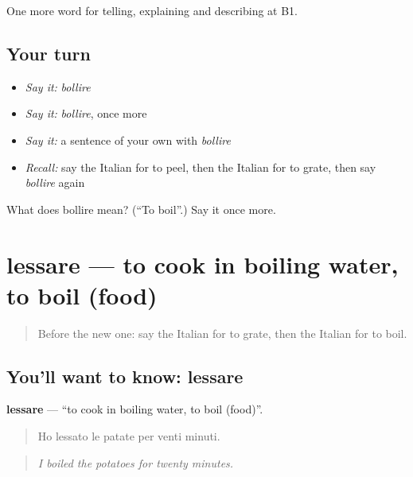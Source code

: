 \begin{grammarlens}[title={What you've built}]
One more word for telling, explaining and describing at B1.
\end{grammarlens}

\subsection*{Your turn}
\begin{itemize}
\raggedright
  \item \emph{Say it:} \emph{bollire}
  \item \emph{Say it:} \emph{bollire}, once more
  \item \emph{Say it:} a sentence of your own with \emph{bollire}
  \item \emph{Recall:} say the Italian for to peel, then the Italian for to grate, then say \emph{bollire} again
\end{itemize}

\begin{tcolorbox}[breakable,colback=teal!4,colframe=teal!35!black,title={Before you move on}]
What does bollire mean? (\textquotedblleft{}To boil\textquotedblright{}.) Say it once more.
\end{tcolorbox}
\section[lessare]{lessare — to cook in boiling water, to boil (food)}

\label{lesson:IT-C333-lessare}



\begin{quote}
Before the new one: say the Italian for to grate, then the Italian for to boil.
\end{quote}

\subsection*{You'll want to know: lessare}
\textbf{lessare} — \textquotedblleft{}to cook in boiling water, to boil (food)\textquotedblright{}.

\begin{quote}
Ho lessato le patate per venti minuti.
\end{quote}

\begin{quote}
\emph{I boiled the potatoes for twenty minutes.}
\end{quote}

